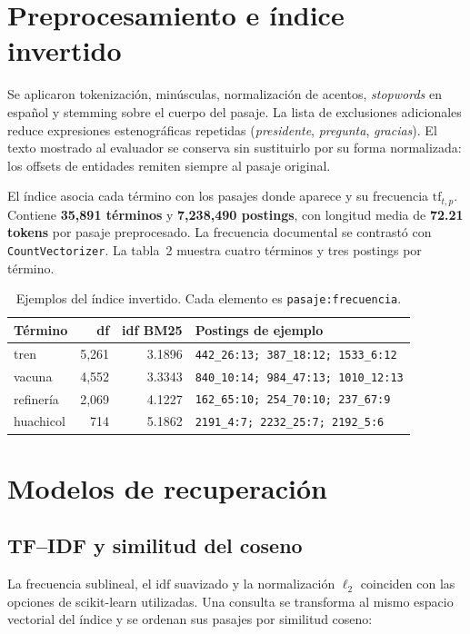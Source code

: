 \documentclass[10pt,a4paper]{article}
\newcommand{\tabfont}{\fontsize{9.1}{11.4}\selectfont}
\begin{document}

\section{Preprocesamiento e índice invertido}
Se aplicaron tokenización, minúsculas, normalización de acentos, \textit{stopwords} en español y stemming sobre el cuerpo del pasaje. La lista de exclusiones adicionales reduce expresiones estenográficas repetidas (\emph{presidente}, \emph{pregunta}, \emph{gracias}). El texto mostrado al evaluador se conserva sin sustituirlo por su forma normalizada: los offsets de entidades remiten siempre al pasaje original.

El índice asocia cada término con los pasajes donde aparece y su frecuencia \(\mathrm{tf}_{t,p}\). Contiene \textbf{35,891 términos} y \textbf{7,238,490 postings}, con longitud media de \textbf{72.21 tokens} por pasaje preprocesado. La frecuencia documental se contrastó con \texttt{CountVectorizer}. La tabla~2 muestra cuatro términos y tres postings por término.

\begin{table}[H]
\centering\tabfont
\caption{Ejemplos del índice invertido. Cada elemento es \texttt{pasaje:frecuencia}.}
\begin{tabularx}{\linewidth}{@{}lrrX@{}}
\toprule
\textbf{Término} & \textbf{df} & \textbf{idf BM25} & \textbf{Postings de ejemplo}\\
\midrule
tren & 5,261 & 3.1896 & \texttt{442\_26:13; 387\_18:12; 1533\_6:12}\\
vacuna & 4,552 & 3.3343 & \texttt{840\_10:14; 984\_47:13; 1010\_12:13}\\
refinería & 2,069 & 4.1227 & \texttt{162\_65:10; 254\_70:10; 237\_67:9}\\
huachicol & 714 & 5.1862 & \texttt{2191\_4:7; 2232\_25:7; 2192\_5:6}\\
\bottomrule
\end{tabularx}
\end{table}

\section{Modelos de recuperación}
\subsection{TF--IDF y similitud del coseno}
La frecuencia sublineal, el \(\mathrm{idf}\) suavizado y la normalización \(\ell_2\) coinciden con las opciones de scikit-learn utilizadas. Una consulta se transforma al mismo espacio vectorial del índice y se ordenan sus pasajes por similitud coseno:
\end{document}
